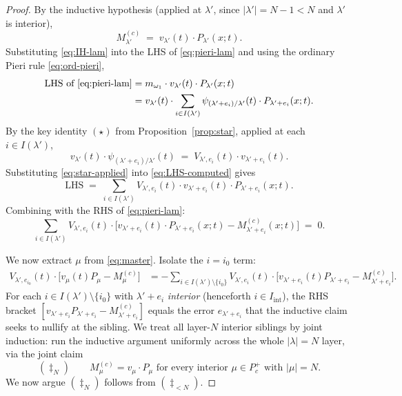 \documentclass[11pt]{article}
\theoremstyle{definition}
\newcommand{\Pcp}{P_c^+}
\begin{document}
\begin{proof}
By the inductive hypothesis (applied at $\lambda'$, since $|\lambda'| = N-1 < N$
and $\lambda'$ is interior),
\begin{equation}
M^{(c)}_{\lambda'} \;=\; v_{\lambda'}(t) \cdot P_{\lambda'}(x;t).
\label{eq:IH-lam}
\end{equation}
Substituting \eqref{eq:IH-lam} into the LHS of \eqref{eq:pieri-lam} and
using the ordinary Pieri rule \eqref{eq:ord-pieri},
\begin{align}
\text{LHS of }\eqref{eq:pieri-lam}
&= m_{\omega_1}\cdot v_{\lambda'}(t)\cdot P_{\lambda'}(x;t) \nonumber \\
&= v_{\lambda'}(t) \cdot \sum_{i \in I(\lambda')} \psi_{(\lambda'+e_i)/\lambda'}(t) \cdot P_{\lambda' + e_i}(x;t).
\label{eq:LHS-computed}
\end{align}
By the key identity $(\star)$ from Proposition~\ref{prop:star}, applied at
each $i \in I(\lambda')$,
\begin{equation}
v_{\lambda'}(t) \cdot \psi_{(\lambda'+e_i)/\lambda'}(t)
\;=\; V_{\lambda', e_i}(t) \cdot v_{\lambda'+e_i}(t).
\label{eq:star-applied}
\end{equation}
Substituting \eqref{eq:star-applied} into \eqref{eq:LHS-computed} gives
\begin{equation}
\text{LHS} \;=\; \sum_{i \in I(\lambda')} V_{\lambda', e_i}(t) \cdot v_{\lambda'+e_i}(t) \cdot P_{\lambda' + e_i}(x;t).
\label{eq:LHS-final}
\end{equation}
Combining with the RHS of \eqref{eq:pieri-lam}:
\begin{equation}
\sum_{i \in I(\lambda')} V_{\lambda', e_i}(t)\cdot \bigl[
v_{\lambda'+e_i}(t)\cdot P_{\lambda'+e_i}(x;t) - M^{(c)}_{\lambda' + e_i}(x;t)
\bigr] \;=\; 0.
\label{eq:master}
\end{equation}

We now extract $\mu$ from \eqref{eq:master}. Isolate the $i = i_0$ term:
\begin{align}
V_{\lambda', e_{i_0}}(t) \cdot \bigl[v_\mu(t) P_\mu - M^{(c)}_\mu\bigr]
&= -\sum_{i \in I(\lambda') \setminus \{i_0\}} V_{\lambda', e_i}(t)\cdot \bigl[v_{\lambda'+e_i}(t) P_{\lambda'+e_i} - M^{(c)}_{\lambda'+e_i}\bigr].
\label{eq:isolate}
\end{align}
For each $i \in I(\lambda') \setminus \{i_0\}$ with $\lambda' + e_i$
\emph{interior} (henceforth $i \in I_{\mathrm{int}}$), the RHS bracket
$[v_{\lambda'+e_i} P_{\lambda'+e_i} - M^{(c)}_{\lambda'+e_i}]$ equals the
error $e_{\lambda'+e_i}$ that the inductive claim seeks to nullify at the
sibling. We treat all layer-$N$ interior siblings by joint induction: run
the inductive argument uniformly across the whole $|\lambda| = N$ layer,
via the joint claim
\[
(\ddagger_N)\qquad M^{(c)}_\mu = v_\mu \cdot P_\mu\text{ for every interior }\mu\in\Pcp\text{ with }|\mu|=N.
\]
We now argue $(\ddagger_N)$ follows from $(\ddagger_{<N})$.


\end{proof}
\end{document}
